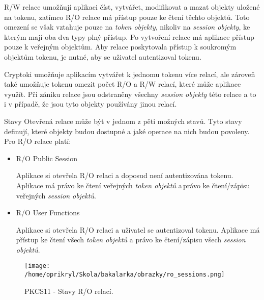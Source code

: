 \documentclass[]{fithesis3}
\begin{document}
		R/W relace umožňují aplikaci číst, vytvářet, modifikovat a mazat objekty uložené na 				tokenu, zatímco R/O relace má přístup pouze ke čtení těchto objektů. Toto omezení se 				však vztahuje pouze na \textit{token objekty}, nikoliv na \textit{session objekty}, ke 				kterým mají oba dva typy plný přístup. Po vytvoření relace má aplikace přístup pouze k 			veřejným objektům. Aby relace poskytovala přístup k soukromým objektům tokenu, je 				nutné, aby se uživatel autentizoval tokenu. 

		Cryptoki umožňuje aplikacím vytvářet k jednomu tokenu více relací, ale zároveň také 				umožňuje tokenu omezit počet R/O a R/W relací, které může aplikace využít. Při zániku 			relace jsou odstraněny všechny \textit{session objekty} této relace a to i v případě, že 				jsou tyto objekty používány jinou relací.

		\newpage
		\noindent Stavy
		\newline
		Otevřená relace může být v jednom z pěti možných stavů. Tyto stavy definují, které 				objekty budou dostupné a jaké operace na nich budou povoleny. Pro R/O relace platí:

		\begin{itemize}
			\item R/O Public Session

			Aplikace si otevřela R/O relaci a doposud není autentizována tokenu. Aplikace má 					právo ke čtení veřejných \textit{token objektů} a\,právo ke čtení/zápisu veřejných 					\textit{session objektů}.
	
			\item R/O User Functions

			Aplikace si otevřela R/O relaci a uživatel se autentizoval tokenu. Aplikace má přístup 				ke čtení všech \textit{token objektů} a právo ke čtení/zápisu všech \textit{session 				objektů}.
		\end{itemize}

		\begin{figure}[!ht]
  			\begin{minipage}{1.00\textwidth}
    				\texttt{[image: /home/oprikryl/Skola/bakalarka/obrazky/ro\_sessions.png]}
  			\end{minipage}
 			\caption{PKCS11 - Stavy R/O relací.}
  			\label{fig:PKCS11 - Stavy R/O relací.}
		\end{figure}
\end{document}
